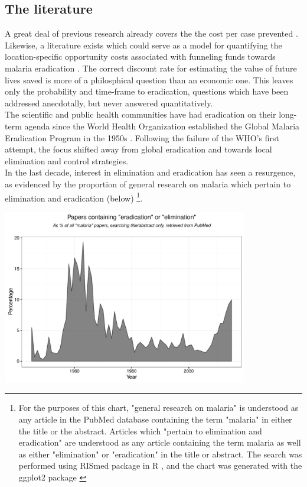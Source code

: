 \documentclass{article}
\begin{document}
\subsection*{The literature}


\noindent A great deal of previous research already covers the the cost per case prevented \cite{Sicuri2011, Silumbe2015, Btto2016, IlungaIlunga2014, Dalaba2015}. Likewise, a literature exists which could serve as a model for quantifying the location-specific opportunity costs associated with funneling funds towards malaria eradication \cite{Stuckey2014, White2011, Korenromp2012}. The correct discount rate for estimating the value of future lives saved is more of a philosphical question than an economic one. This leaves only the probability and time-frame to eradication, questions which have been addressed anecdotally, but never answered quantitatively. \\

\noindent The scientific and public health communities have had eradication on their long-term agenda since the World Health Organization established the Global Malaria Eradication Program in the 1950s \cite{Alonso2011, Njera2011}. Following the failure of the WHO's first attempt, the focus shifted away from global eradication and towards local elimination and control strategies. \\


\noindent In the last decade, interest in elimination and eradication has seen a resurgence, as evidenced by the proportion of general research on malaria which pertain to elimination and eradication (below) \footnote{For the purposes of this chart, "general research on malaria" is understood as any article in the PubMed database containing the term "malaria" in either the title or the abstract. Articles which "pertain to elimination and eradication" are understood as any article containing the term malaria as well as either "elimination" or "eradication" in the title or abstract. The search was performed using RISmed package \cite{Kovalchik2015} in R \cite{R}, and the chart was generated with the ggplot2 package \cite{ggplot2}}.

\begin{center}
\includegraphics[height=3in]{pubmed2.pdf}
\end{center}
\end{document}
